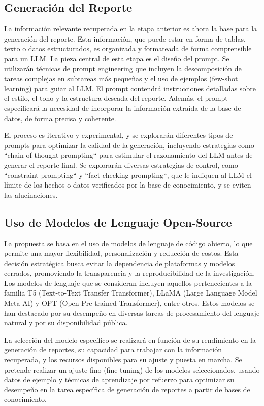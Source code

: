 \subsection{Generación del Reporte}

La información relevante recuperada en la etapa anterior es ahora la base para la generación del reporte. Esta información, que puede estar en forma de tablas, texto o datos estructurados, es organizada y formateada de forma comprensible para un LLM. La pieza central de esta etapa es el diseño del prompt. Se utilizarán técnicas de prompt engineering que incluyen la descomposición de tareas complejas en subtareas más pequeñas y el uso de ejemplos (few-shot learning) para guiar al LLM. El prompt contendrá instrucciones detalladas sobre el estilo, el tono y la estructura deseada del reporte. Además, el prompt especificará la necesidad de incorporar la información extraída de la base de datos, de forma precisa y coherente.

El proceso es iterativo y experimental, y se explorarán diferentes tipos de prompts para optimizar la calidad de la generación, incluyendo estrategias como ``chain-of-thought prompting`` para estimular el razonamiento del LLM antes de generar el reporte final. Se explorarán diversas estrategias de control, como ``constraint prompting`` y ``fact-checking prompting``, que le indiquen al LLM el límite de los hechos o datos verificados por la base de conocimiento, y se eviten las alucinaciones.

\subsection{Uso de Modelos de Lenguaje Open-Source}

La propuesta se basa en el uso de modelos de lenguaje de código abierto, lo que permite una mayor flexibilidad, personalización y reducción de costos. Esta decisión estratégica busca evitar la dependencia de plataformas y modelos cerrados, promoviendo la transparencia y la reproducibilidad de la investigación. Los modelos de lenguaje que se consideran incluyen aquellos pertenecientes a la familia T5 (Text-to-Text Transfer Transformer), LLaMA (Large Language Model Meta AI) y OPT (Open Pre-trained Transformer), entre otros. Estos modelos se han destacado por su desempeño en diversas tareas de procesamiento del lenguaje natural y por su disponibilidad pública.

La selección del modelo específico se realizará en función de su rendimiento en la generación de reportes, su capacidad para trabajar con la información recuperada, y los recursos disponibles para su ajuste y puesta en marcha. Se pretende realizar un ajuste fino (fine-tuning) de los modelos seleccionados, usando datos de ejemplo y técnicas de aprendizaje por refuerzo para optimizar su desempeño en la tarea específica de generación de reportes a partir de bases de conocimiento.

